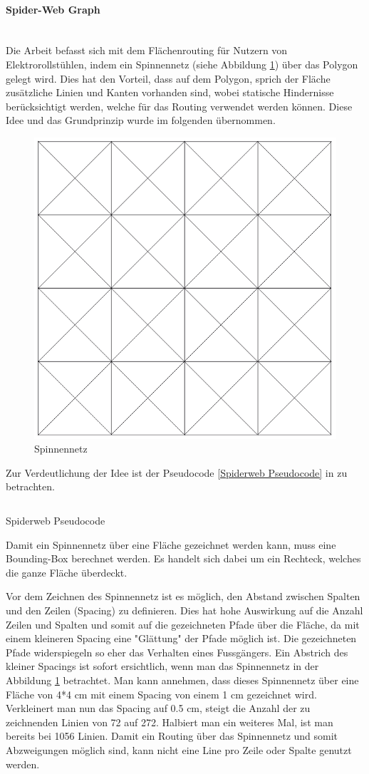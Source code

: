 \paragraph{Spider-Web Graph}~\\


Die Arbeit \cite{dzafic_spider_web_graph} befasst sich mit dem Flächenrouting für Nutzern von Elektrorollstühlen, indem ein Spinnennetz (siehe Abbildung \ref{fig:spiderweb}) über das Polygon gelegt wird. Dies hat den Vorteil, dass auf dem Polygon, sprich der Fläche zusätzliche Linien und Kanten vorhanden sind, wobei statische Hindernisse berücksichtigt werden, welche für das Routing verwendet werden können. Diese Idee und das Grundprinzip wurde im folgenden übernommen.

\begin{figure}[ht]
\centering
\includegraphics[width=0.5\linewidth]{technicalreport/img/spiderweb}
\caption[Spinnennetz]{Spinnennetz}
\label{fig:spiderweb}
\end{figure}

Zur Verdeutlichung der Idee ist der Pseudocode \ref{Spiderweb Pseudocode} in zu betrachten.

\begin{listing}[ht]
    \inputminted{python}{technicalreport/listing/spiderweb_pseudocode.py}
    \caption{Spiderweb Pseudocode}
    \label{Spiderweb Pseudocode}
\end{listing}

Damit ein Spinnennetz über eine Fläche gezeichnet werden kann, muss eine Bounding-Box berechnet werden. Es handelt sich dabei um ein Rechteck, welches die ganze Fläche überdeckt. 

Vor dem Zeichnen des Spinnennetz ist es möglich, den Abstand zwischen Spalten und den Zeilen (Spacing) zu definieren. Dies hat hohe Auswirkung auf die Anzahl Zeilen und Spalten und somit auf die gezeichneten Pfade über die Fläche, da mit einem kleineren Spacing eine "Glättung" der Pfade möglich ist. Die gezeichneten Pfade widerspiegeln so eher das Verhalten eines Fussgängers. Ein Abstrich des kleiner Spacings ist sofort ersichtlich, wenn man das Spinnennetz in der Abbildung \ref{fig:spiderweb} betrachtet. Man kann annehmen, dass dieses Spinnennetz über eine Fläche von 4*4 cm mit einem Spacing von einem 1 cm gezeichnet wird. Verkleinert man nun das Spacing auf 0.5 cm, steigt die Anzahl der zu zeichnenden Linien von 72 auf 272. Halbiert man ein weiteres Mal, ist man bereits bei 1056 Linien. Damit ein Routing über das Spinnennetz und somit Abzweigungen möglich sind, kann nicht eine Line pro Zeile oder Spalte genutzt werden.

